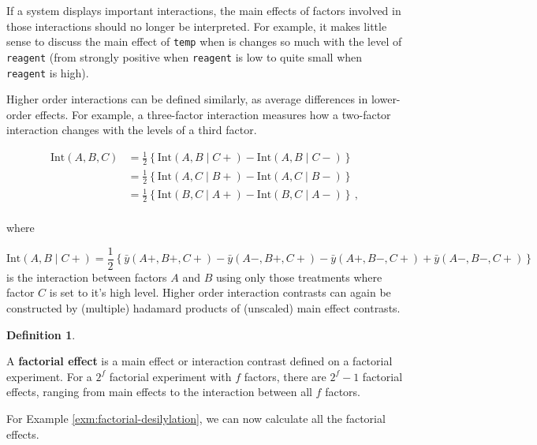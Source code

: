 \documentclass[
]{book}
\theoremstyle{definition}
\newtheorem{definition}{Definition}[chapter]
\theoremstyle{definition}
\theoremstyle{definition}
\theoremstyle{definition}
\theoremstyle{remark}
\begin{document}
If a system displays important interactions, the main effects of factors involved in those interactions should no longer be interpreted. For example, it makes little sense to discuss the main effect of \texttt{temp} when is changes so much with the level of \texttt{reagent} (from strongly positive when \texttt{reagent} is low to quite small when \texttt{reagent} is high).

Higher order interactions can be defined similarly, as average differences in lower-order effects. For example, a three-factor interaction measures how a two-factor interaction changes with the levels of a third factor.

\begin{align*}
\mbox{Int}(A, B, C) & = \frac{1}{2}\left\{\mbox{Int}(A, B \mid C+) - \mbox{Int}(A, B \mid C-)\right\} \\
& = \frac{1}{2}\left\{\mbox{Int}(A, C \mid B+) - \mbox{Int}(A, C \mid B-)\right\} \\
& = \frac{1}{2}\left\{\mbox{Int}(B, C \mid A+) - \mbox{Int}(B, C \mid A-)\right\}\,, \\
\end{align*}

where

\[
\mbox{Int}(A, B \mid C+) = \frac{1}{2}\left\{\bar{y}(A+, B+, C+) - \bar{y}(A-, B+, C+) - \bar{y}(A+, B-, C+) + \bar{y}(A-, B-, C+)\right\}
\]
is the interaction between factors \(A\) and \(B\) using only those treatments where factor \(C\) is set to it's high level. Higher order interaction contrasts can again be constructed by (multiple) hadamard products of (unscaled) main effect contrasts.

\begin{definition}
\protect\hypertarget{def:factorial-effects}{}\label{def:factorial-effects}

A \textbf{factorial effect} is a main effect or interaction contrast defined on a factorial experiment. For a \(2^f\) factorial experiment with \(f\) factors, there are \(2^f-1\) factorial effects, ranging from main effects to the interaction between all \(f\) factors.

\end{definition}

For Example \ref{exm:factorial-desilylation}, we can now calculate all the factorial effects.
\end{document}
